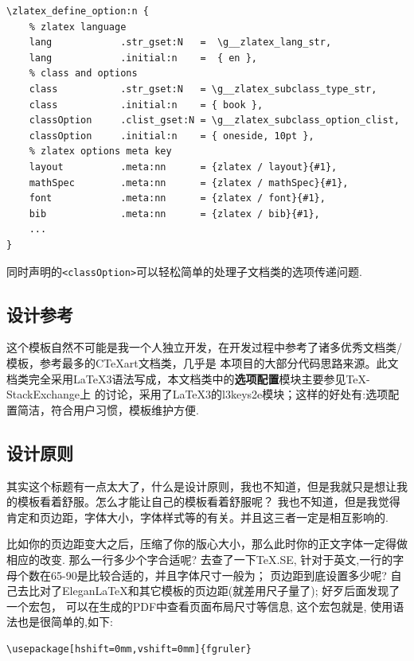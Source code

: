 \begin{verbatim}
\zlatex_define_option:n {
    % zlatex language
    lang            .str_gset:N   =  \g__zlatex_lang_str,
    lang            .initial:n    =  { en },
    % class and options
    class           .str_gset:N   = \g__zlatex_subclass_type_str,
    class           .initial:n    = { book },
    classOption     .clist_gset:N = \g__zlatex_subclass_option_clist,
    classOption     .initial:n    = { oneside, 10pt },
    % zlatex options meta key 
    layout          .meta:nn      = {zlatex / layout}{#1},
    mathSpec        .meta:nn      = {zlatex / mathSpec}{#1},
    font            .meta:nn      = {zlatex / font}{#1},
    bib             .meta:nn      = {zlatex / bib}{#1},
    ...
}
\end{verbatim}

同时声明的\texttt{<classOption>}可以轻松简单的处理子文档类的选项传递问题.

\subsection{设计参考}
这个模板自然不可能是我一个人独立开发，在开发过程中参考了诸多优秀文档类/模板，参考最多的{C\TeX{}art}文档类，几乎是
本项目的大部分代码思路来源。此文档类完全采用\LaTeX3语法写成，本文档类中的\textbf{选项配置}模块主要参见\TeX-StackExchange上
的讨论，采用了\LaTeX3的l3keys2e模块；这样的好处有:选项配置简洁，符合用户习惯，模板维护方便.


\subsection{设计原则}
其实这个标题有一点太大了，什么是设计原则，我也不知道，但是我就只是想让我的模板看着舒服。怎么才能让自己的模板看着舒服呢？
我也不知道，但是我觉得肯定和页边距，字体大小，字体样式等的有关。并且这三者一定是相互影响的. 

比如你的页边距变大之后，压缩了你的版心大小，那么此时你的正文字体一定得做相应的改变. 那么一行多少个字合适呢?
去查了一下\TeX.SE, 针对于英文,一行的字母个数在65-90是比较合适的，并且字体尺寸一般为\cmd{10pt,11pt,12pt}；
页边距到底设置多少呢? 自己去比对了Elegan\LaTeX{}和其它模板的页边距(就差用尺子量了); 好歹后面发现了一个宏包，
可以在生成的PDF中查看页面布局尺寸等信息, 这个宏包就是, 使用语法也是很简单的,如下:

\begin{verbatim}
\usepackage[hshift=0mm,vshift=0mm]{fgruler}
\end{verbatim}

